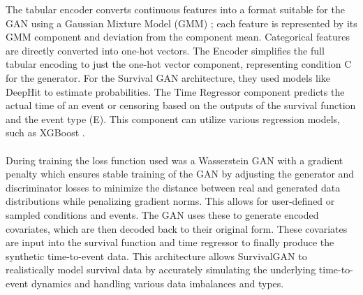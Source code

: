 \noindent The tabular encoder converts continuous features into a format suitable for the GAN using a Gaussian Mixture Model (GMM) \parencite{norcliffe_survivalgan_2023}; each feature is represented by its GMM component and deviation from the component mean. Categorical features are directly converted into one-hot vectors. The Encoder simplifies the full tabular encoding to just the one-hot vector component, representing condition C for the generator. For the Survival GAN architecture, they used models like DeepHit \parencite{norcliffe_survivalgan_2023} to estimate probabilities. The Time Regressor component predicts the actual time of an event or censoring based on the outputs of the survival function and the event type (E). This component can utilize various regression models, such as XGBoost \parencite{norcliffe_survivalgan_2023}.
\\\\
\noindent During training the loss function used was a Wasserstein GAN \parencite{norcliffe_survivalgan_2023} with a gradient penalty which ensures stable training of the GAN by adjusting the generator and discriminator losses to minimize the distance between real and generated data distributions while penalizing gradient norms. This allows for user-defined or sampled conditions and events. The GAN uses these to generate encoded covariates, which are then decoded back to their original form. These covariates are input into the survival function and time regressor to finally produce the synthetic time-to-event data. This architecture allows SurvivalGAN to realistically model survival data by accurately simulating the underlying time-to-event dynamics and handling various data imbalances and types.


